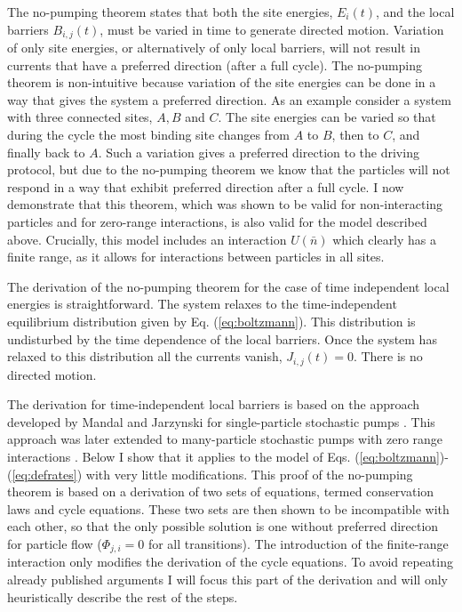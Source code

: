\documentclass[aps,pre,showpacs,amsmath,amssymb,amsfonts,superscriptaddress,onecolumn,longbibliography]{revtex4-1}
\begin{document}
The no-pumping theorem states that both the site energies, $E_i (t)$, and the local barriers $B_{i,j} (t)$, must be varied in time
to generate directed motion.
Variation of only site energies, or alternatively of only local barriers, will not result in currents that have a preferred direction (after a full cycle).
The no-pumping theorem is non-intuitive because variation of the site energies can be done
in a way that gives the system a preferred direction. As an example consider a system with three connected sites, $A,B$ and $C$.
The site energies can be varied so that during the cycle the most binding site changes from $A$ to $B$, then to $C$, and finally back to $A$.
Such a variation gives a preferred direction to the driving protocol, but due to the no-pumping theorem we know that the particles
will not respond in a way that exhibit preferred direction after a full cycle.
I now demonstrate that this theorem, which was shown to be valid for non-interacting particles and for zero-range interactions, is also valid for
the model described above. Crucially, this model includes an interaction $U(\bar{n})$ which clearly has a finite range, as it allows for interactions
between particles in all sites.

The derivation of the no-pumping theorem for the case of time independent local energies is straightforward. The system relaxes to
the time-independent equilibrium distribution given by Eq. (\ref{eq:boltzmann}). This distribution is undisturbed by the time dependence of
the local barriers. Once the system has relaxed to this distribution all the currents vanish, $J_{i,j} (t)=0$. There is no directed motion.

The derivation for time-independent local barriers is based on
the approach developed by Mandal and Jarzynski for single-particle
stochastic pumps \cite{mandal_proof_2011}. This approach was later extended to many-particle stochastic pumps
with zero range interactions \cite{asban_no-pumping_2014,mandal_unification_2014}. Below I show that it applies
to the model of Eqs. (\ref{eq:boltzmann})-(\ref{eq:defrates}) with very little modifications.
This proof of the
no-pumping theorem is based on a derivation of two sets of equations, termed conservation laws and cycle equations. These two sets
are then shown to be incompatible with each other, so that the only possible solution is one without
preferred direction for particle flow ($ \Phi_{j,i} =0$ for all transitions). The introduction of the finite-range interaction only modifies the derivation
of the cycle equations. To avoid repeating already published arguments I will focus this part of the derivation
and will only heuristically describe the rest of the steps.
\end{document}
